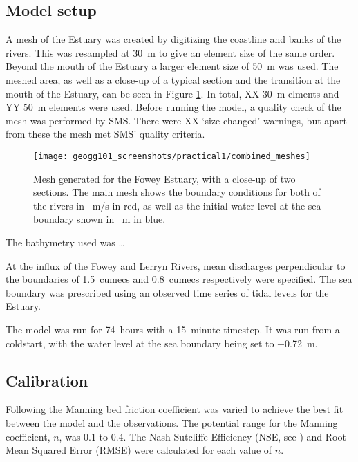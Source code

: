 \documentclass{article}
\begin{document}
\subsection{Model setup}

A mesh of the Estuary was created by digitizing the coastline and banks of the rivers. This was resampled at \SI{30}{m} to give an element size of the same order. Beyond the mouth of the Estuary a larger element size of \SI{50}{m} was used. The meshed area, as well as a close-up of a typical section and the transition at the mouth of the Estuary, can be seen in Figure \ref{fig:combined_meshes}. In total, XX \SI{30}{m} elments and YY \SI{50}{m} elements were used. Before running the model, a quality check of the mesh was performed by SMS. There were XX `size changed' warnings, but apart from these the mesh met SMS' quality criteria.


\begin{figure}[hbp]
    \centering
    \texttt{[image: geogg101\_screenshots/practical1/combined\_meshes]}
    \caption{Mesh generated for the Fowey Estuary, with a close-up of two sections. The main mesh shows the boundary conditions for both of the rivers in \SI{}{m/s} in red, as well as the initial water level at the sea boundary shown in \SI{}{m} in blue.}
    \label{fig:combined_meshes}
\end{figure}

The bathymetry used was \ldots

At the influx of the Fowey and Lerryn Rivers, mean discharges perpendicular to the boundaries of \SI{1.5}{cumecs} and \SI{0.8}{cumecs} respectively were specified. The sea boundary was prescribed using an observed time series of tidal levels for the Estuary.

The model was run for \SI{74}{hours} with a \SI{15}{minute} timestep. It was run from a coldstart, with the water level at the sea boundary being set to \SI{-0.72}{m}. 

\subsection{Calibration}

Following \textcite{piedra2007residual, sousa2007hydrodynamic} the  Manning bed friction coefficient was varied to achieve the best fit between the model and the observations. The potential range for the Manning coefficient, $n$, was 0.1 to 0.4. The Nash-Sutcliffe Efficiency (NSE, see \textcite{nash1970river}) and Root Mean Squared Error (RMSE) were calculated for each value of $n$. 
\end{document}
